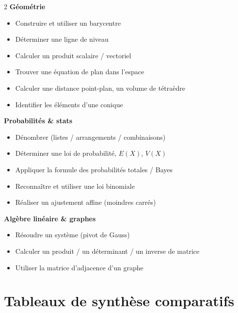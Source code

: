 \begin{multicols}{2}
\textbf{Géométrie}
\begin{itemize}\setlength\itemsep{1pt}
\item Construire et utiliser un barycentre
\item Déterminer une ligne de niveau
\item Calculer un produit scalaire / vectoriel
\item Trouver une équation de plan dans l'espace
\item Calculer une distance point-plan, un volume de tétraèdre
\item Identifier les éléments d'une conique
\end{itemize}

\textbf{Probabilités \& stats}
\begin{itemize}\setlength\itemsep{1pt}
\item Dénombrer (listes / arrangements / combinaisons)
\item Déterminer une loi de probabilité, $E(X)$, $V(X)$
\item Appliquer la formule des probabilités totales / Bayes
\item Reconnaître et utiliser une loi binomiale
\item Réaliser un ajustement affine (moindres carrés)
\end{itemize}

\textbf{Algèbre linéaire \& graphes}
\begin{itemize}\setlength\itemsep{1pt}
\item Résoudre un système (pivot de Gauss)
\item Calculer un produit / un déterminant / un inverse de matrice
\item Utiliser la matrice d'adjacence d'un graphe
\end{itemize}
\end{multicols}

\section{Tableaux de synthèse comparatifs}

